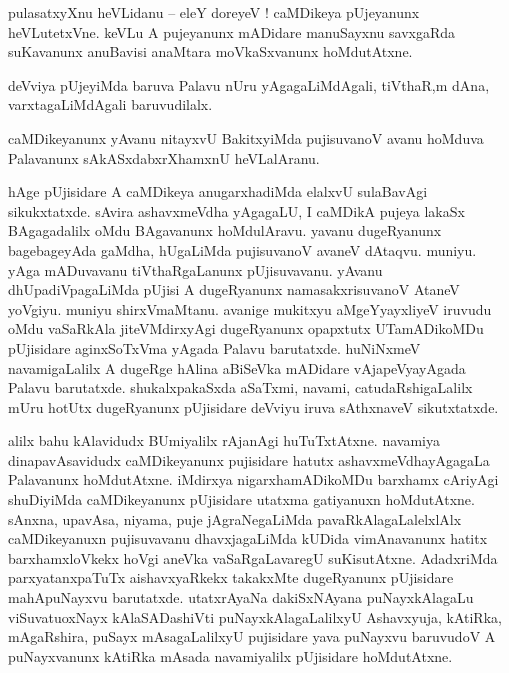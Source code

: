 \documentclass{article}
\begin{document}
\begin{mng}%
pulasatxyXnu heVLidanu -- eleY doreyeV ! caMDikeya pUjeyanunx heVLutetxVne. keVLu A pujeyanunx 
mADidare manuSayxnu savxgaRda suKavanunx anuBavisi anaMtara moVkaSxvanunx hoMdutAtxne.
\end{mng}

\begin{mng}%
deVviya pUjeyiMda baruva Palavu nUru yAgagaLiMdAgali, tiVthaR,m dAna, varxtagaLiMdAgali baruvudilalx.
\end{mng}

\begin{mng}%
caMDikeyanunx yAvanu nitayxvU BakitxyiMda pujisuvanoV avanu hoMduva Palavanunx sAkASxdabxrXhamxnU 
heVLalAranu.
\end{mng}

\begin{mng}%
hAge pUjisidare A caMDikeya anugarxhadiMda elalxvU sulaBavAgi sikukxtatxde. sAvira ashavxmeVdha 
yAgagaLU, I caMDikA pujeya lakaSx BAgagadalilx oMdu BAgavanunx hoMdulAravu. yavanu dugeRyanunx 
bagebageyAda gaMdha, hUgaLiMda pujisuvanoV avaneV dAtaqvu. muniyu. yAga mADuvavanu 
tiVthaRgaLanunx pUjisuvavanu. yAvanu dhUpadiVpagaLiMda pUjisi A dugeRyanunx namasakxrisuvanoV 
AtaneV yoVgiyu. muniyu shirxVmaMtanu. avanige mukitxyu aMgeYyayxliyeV iruvudu oMdu vaSaRkAla 
jiteVMdirxyAgi dugeRyanunx opapxtutx UTamADikoMDu pUjisidare aginxSoTxVma yAgada Palavu 
barutatxde. huNiNxmeV navamigaLalilx A dugeRge hAlina aBiSeVka mADidare vAjapeVyayAgada Palavu 
barutatxde. shukalxpakaSxda aSaTxmi, navami, catudaRshigaLalilx mUru hotUtx dugeRyanunx 
pUjisidare deVviyu iruva sAthxnaveV sikutxtatxde.
\end{mng}

\begin{mng}%
alilx bahu kAlavidudx BUmiyalilx rAjanAgi huTuTxtAtxne. navamiya dinapavAsavidudx caMDikeyanunx 
pujisidare hatutx ashavxmeVdhayAgagaLa Palavanunx hoMdutAtxne. iMdirxya nigarxhamADikoMDu 
barxhamx cAriyAgi shuDiyiMda caMDikeyanunx pUjisidare utatxma gatiyanuxn hoMdutAtxne. sAnxna, 
upavAsa, niyama, puje jAgraNegaLiMda pavaRkAlagaLalelxlAlx caMDikeyanuxn pujisuvavanu 
dhavxjagaLiMda kUDida vimAnavanunx hatitx barxhamxloVkekx hoVgi aneVka vaSaRgaLavaregU 
suKisutAtxne. AdadxriMda parxyatanxpaTuTx aishavxyaRkekx takakxMte dugeRyanunx pUjisidare 
mahApuNayxvu barutatxde. utatxrAyaNa dakiSxNAyana puNayxkAlagaLu viSuvatuoxNayx kAlaSADashiVti 
puNayxkAlagaLalilxyU Ashavxyuja, kAtiRka, mAgaRshira, puSayx mAsagaLalilxyU pujisidare yava 
puNayxvu baruvudoV A puNayxvanunx kAtiRka mAsada navamiyalilx pUjisidare hoMdutAtxne.
\end{mng}
\end{document}
